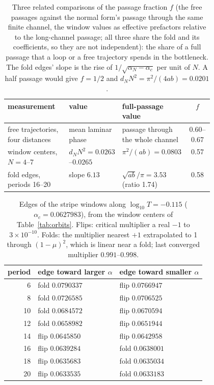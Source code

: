 \documentclass[11pt,letterpaper]{article}
\begin{document}
\begin{table}[H]
\centering\small
\begin{tabular}{lp{0.2\linewidth}p{0.27\linewidth}c}
\toprule
measurement & value & full-passage value & $f$ \\
\midrule
free trajectories, four distances & mean laminar phase & passage through the whole channel & 0.60--0.67 \\
window centers, $N=4$--7 & $d_NN^2=0.0263$--$0.0265$ & $\pi^2/(ab)=0.0803$ & 0.57 \\
fold edges, periods 16--20 & slope $6.13$ & $\sqrt{ab}/\pi=3.53$ (ratio 1.74) & 0.58 \\
\bottomrule
\end{tabular}
\caption{Three related comparisons of the passage fraction $f$ (the free passages against the normal form's passage
through the same finite channel, the window values as effective prefactors relative to the long-channel passage; all
three share the fold and its coefficients, so they are not independent): the share of a full passage that a loop or a free
trajectory spends in the bottleneck. The fold edges' slope is the rise of $1/\sqrt{\alpha_N-\alpha_c}$ per unit of
$N$. A half passage would give $f=1/2$ and $d_NN^2=\pi^2/(4ab)=0.0201$.}
\label{tab:fraction}
\end{table}
\begin{table}[H]
\centering\small
\begin{tabular}{rll}
\toprule
period & edge toward larger $\alpha$ & edge toward smaller $\alpha$ \\
\midrule
6 & fold $0.0790337$ & flip $0.0766947$ \\
8 & fold $0.0726585$ & flip $0.0706525$ \\
10 & fold $0.0684572$ & flip $0.0670594$ \\
12 & fold $0.0658982$ & flip $0.0651944$ \\
14 & flip $0.0645850$ & flip $0.0642958$ \\
16 & flip $0.0639284$ & fold $0.0638001$ \\
18 & flip $0.0635683$ & fold $0.0635034$ \\
20 & flip $0.0633535$ & fold $0.0633183$ \\
\bottomrule
\end{tabular}
\caption{Edges of the stripe windows along $\log_{10}T=-0.115$ ($\alpha_c=0.0627983$), from the window centers of
Table~\ref{tab:orbits}. Flips: critical multiplier a real $-1$ to $3\times10^{-10}$. Folds: the multiplier nearest $+1$
extrapolated to 1 through $(1-\mu)^2$, which is linear near a fold; last converged multiplier $0.991$--$0.998$.}
\label{tab:edges}
\end{table}
\end{document}
